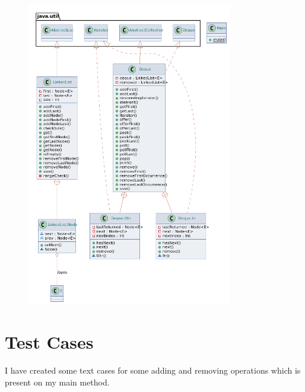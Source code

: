 \documentclass[a4paper]{article}
\begin{document}
\begin{large}
  \begin{figure}[htp]
    \centering
    \includegraphics[width=0.8\textwidth]{class-diagram}
  \end{figure}

  \newpage


  \section{Test Cases}

  I have created some text cases for some adding and removing operations which is present on my main method.


\end{large}
\end{document}

